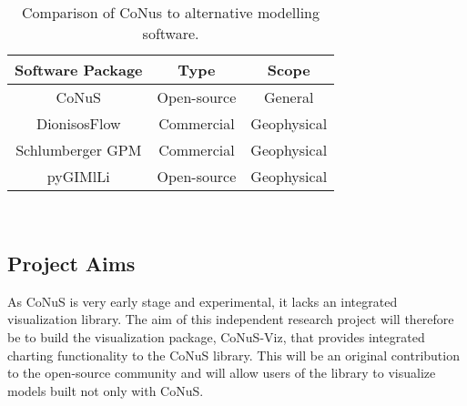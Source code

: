 \documentclass[12pt]{article}
\begin{document}
\begin{table}
	\begin{center}
	\begin{tabular}{||c c c ||} 
		\hline
		\textbf{Software Package} & \textbf{Type} & \textbf{Scope} \\ [0.5ex]
		\hline
		\rowcolor{yellow}CoNuS & Open-source & General \\
		\hline 
		DionisosFlow & Commercial & Geophysical \\ 
		\hline
		Schlumberger GPM & Commercial & Geophysical \\
		\hline
		pyGIMlLi & Open-source & Geophysical \\ [0.5ex] 
		\hline
	\end{tabular}
	\\[10pt]
	\caption{\label{tab:table-name}Comparison of CoNus to alternative modelling software.}
	\end{center}
\end{table}

\subsection{Project Aims}
As CoNuS is very early stage and experimental, it lacks an integrated visualization library. The aim of this independent research project will therefore be to build the visualization package, CoNuS-Viz, that provides integrated charting functionality to the CoNuS library. This will be an original contribution to the open-source community and will allow users of the library to visualize models built not only with CoNuS.


\pagebreak
\printbibliography
\end{document}
